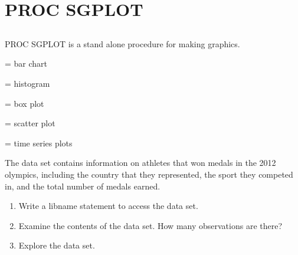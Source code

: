 \section[PROC SGPLOT]{PROC SGPLOT}
\subsection{}
\begin{frame}
\end{frame}

\begin{frame}
PROC SGPLOT is a stand alone procedure for making graphics.
\bi
\item {} = bar chart
\item {} = histogram
\item {} = box plot
\item {} = scatter plot
\item {} = time series plots
\ei
\end{frame}


\begin{frame}[fragile]
The  data set contains information on athletes that won medals in the 2012 olympics, including the country that they represented, the sport they competed in, and the total number of medals earned.
\vskip10pt
\oyo
\begin{enumerate}
    \item Write a libname statement to access the  data set.
    \item Examine the contents of the  data set.  How many observations are there?
    \item Explore the data set.
\end{enumerate}
\end{frame}

